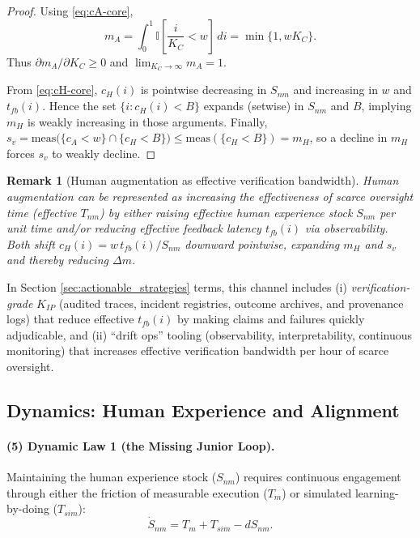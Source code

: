 \documentclass[12pt, letter]{article}
\newtheorem{remark}{Remark}
\begin{document}
\begin{proof}
Using \eqref{eq:cA-core},
\[
m_A = \int_0^1 \mathbb{I}\!\left[\frac{i}{K_C}<w\right]\,di
= \min\{1, wK_C\}.
\]
Thus $\partial m_A/\partial K_C \ge 0$ and $\lim_{K_C\to\infty} m_A = 1$.

From \eqref{eq:cH-core}, $c_H(i)$ is pointwise decreasing in $S_{nm}$ and increasing in
$w$ and $t_{fb}(i)$. Hence the set $\{i: c_H(i)<B\}$ expands (setwise) in $S_{nm}$ and $B$,
implying $m_H$ is weakly increasing in those arguments. Finally,
$s_v = \text{meas}\big(\{c_A<w\}\cap\{c_H<B\}\big)\le \text{meas}(\{c_H<B\})=m_H$, so a
decline in $m_H$ forces $s_v$ to weakly decline.
\end{proof}

\begin{remark}[Human augmentation as effective verification bandwidth]\label{rem:augmentation-core}
Human augmentation can be represented as increasing the effectiveness of scarce oversight time (effective $T_{nm}$) by either raising effective human experience stock $S_{nm}$ per unit time and/or reducing effective feedback latency $t_{fb}(i)$ via observability. Both shift $c_H(i)=w\,t_{fb}(i)/S_{nm}$ downward pointwise, expanding $m_H$ and $s_v$ and thereby reducing $\Delta m$.
\end{remark}

In Section \ref{sec:actionable_strategies} terms, this channel includes (i) \emph{verification-grade} $K_{IP}$ (audited traces, incident registries, outcome archives, and provenance logs) that reduce effective $t_{fb}(i)$ by making claims and failures quickly adjudicable, and (ii) ``drift ops'' tooling (observability, interpretability, continuous monitoring) that increases effective verification bandwidth per hour of scarce oversight.

\subsection{Dynamics: Human Experience and Alignment}\label{subsec:core-dynamics}

\paragraph{(5) Dynamic Law 1 (the Missing Junior Loop).}
Maintaining the human experience stock ($S_{nm}$) requires continuous engagement through either the friction of measurable execution ($T_m$) or simulated learning-by-doing ($T_{sim}$):
\begin{equation}
\dot S_{nm} = T_m + T_{sim} - dS_{nm}.
 \label{eq:Snm-core}
\end{equation}
\end{document}
